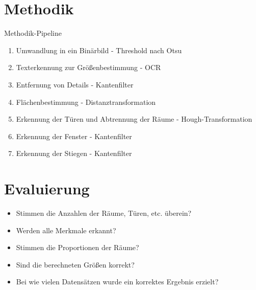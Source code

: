 \documentclass[deutsch]{scrartcl}
\begin{document}
\section{Methodik}
Methodik-Pipeline
\begin{enumerate}
	\item Umwandlung in ein Binärbild - Threshold nach Otsu
	\item Texterkennung zur Größenbestimmung - OCR
	\item Entfernung von Details - Kantenfilter
	\item Flächenbestimmung - Distanztransformation
	\item Erkennung der Türen und Abtrennung der Räume - Hough-Transformation
	\item Erkennung der Fenster - Kantenfilter
	\item Erkennung der Stiegen - Kantenfilter
\end{enumerate}

\section{Evaluierung}
\begin{itemize}
	\item Stimmen die Anzahlen der Räume, Türen, etc. überein?
	\item Werden alle Merkmale erkannt?
	\item Stimmen die Proportionen der Räume?
	\item Sind die berechneten Größen korrekt?
	\item Bei wie vielen Datensätzen wurde ein korrektes Ergebnis erzielt?

\end{itemize}
\end{document}
